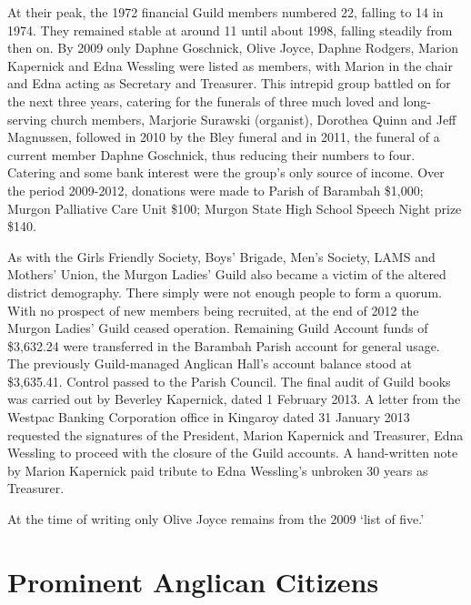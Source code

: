 At their peak, the 1972 financial Guild members numbered 22, falling to 14 in 1974. They remained stable at around 11 until about 1998, falling steadily from then on. By 2009 only Daphne Goschnick, Olive Joyce, Daphne Rodgers, Marion Kapernick and Edna Wessling were listed as members, with Marion in the chair and Edna acting as Secretary and Treasurer. This intrepid group battled on for the next three years, catering for the funerals of three much loved and long-serving church members, Marjorie Surawski (organist), Dorothea Quinn and Jeff Magnussen, followed in 2010 by the Bley funeral and in 2011, the funeral of a current member Daphne Goschnick, thus reducing their numbers to four. Catering and some bank interest were the group's only source of income. Over the period 2009-2012, donations were made to Parish of Barambah \$1,000; Murgon Palliative Care Unit \$100; Murgon State High School Speech Night prize \$140.



\balance


As with the Girls Friendly Society, Boys' Brigade, Men's Society, LAMS and Mothers' Union, the Murgon Ladies' Guild also became a victim of the altered district demography. There simply were not enough people to form a quorum. With no prospect of new members being recruited, at the end of 2012 the Murgon Ladies' Guild ceased operation. Remaining Guild Account funds of \$3,632.24 were transferred in the Barambah Parish account for general usage. The previously Guild-managed Anglican Hall's account balance stood at \$3,635.41. Control passed to the Parish Council. The final audit of Guild books was carried out by Beverley Kapernick, dated 1 February 2013. A letter from the Westpac Banking Corporation office in Kingaroy dated 31 January 2013 requested the signatures of the President, Marion Kapernick and Treasurer, Edna Wessling to proceed with the closure of the Guild accounts. A hand-written note by Marion Kapernick paid tribute to Edna Wessling's unbroken 30 years as Treasurer.



At the time of writing only Olive Joyce remains from the 2009 `list of five.'



\printendnotes[custom]
\setcounter{endnote}{0}


\chapter{Prominent Anglican Citizens}
\nobalance


